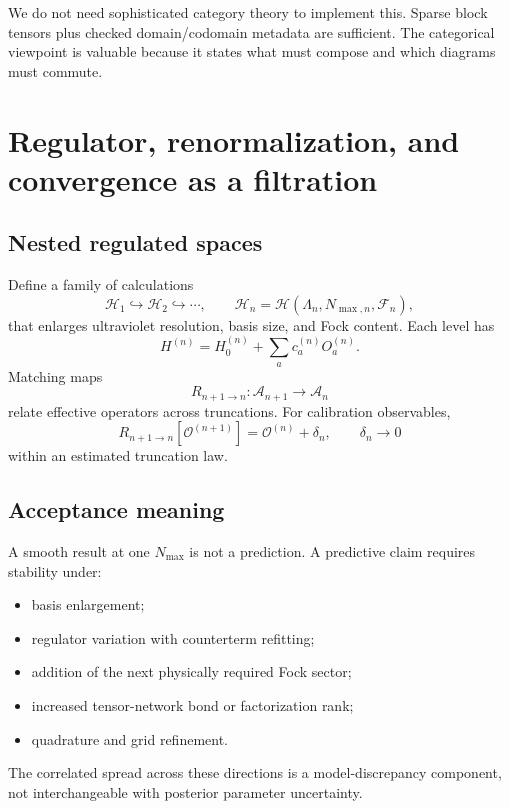 \documentclass[11pt]{article}
\newcommand{\Hil}{\mathcal H}
\newcommand{\Alg}{\mathcal A}
\begin{document}
We do not need sophisticated category theory to implement this.  Sparse
block tensors plus checked domain/codomain metadata are sufficient.  The
categorical viewpoint is valuable because it states what must compose and
which diagrams must commute.

\section{Regulator, renormalization, and convergence as a filtration}

\subsection{Nested regulated spaces}

Define a family of calculations
\begin{equation}
\Hil_1\hookrightarrow\Hil_2\hookrightarrow\cdots,
\qquad
\Hil_n=\Hil(\Lambda_n,N_{\max,n},\mathcal F_n),
\label{eq:filtration}
\end{equation}
that enlarges ultraviolet resolution, basis size, and Fock content.  Each
level has
\begin{equation}
H^{(n)}=H_0^{(n)}+\sum_a c_a^{(n)}O_a^{(n)}.
\end{equation}
Matching maps
\begin{equation}
R_{n+1\to n}:\Alg_{n+1}\longrightarrow\Alg_n
\label{eq:matching-map}
\end{equation}
relate effective operators across truncations.  For calibration observables,
\begin{equation}
R_{n+1\to n}[\mathcal O^{(n+1)}]
=\mathcal O^{(n)}+\delta_n,
\qquad
\delta_n\to0
\label{eq:projective-consistency}
\end{equation}
within an estimated truncation law.

\subsection{Acceptance meaning}

A smooth result at one \(N_{\max}\) is not a prediction.  A predictive
claim requires stability under:
\begin{itemize}
\item basis enlargement;
\item regulator variation with counterterm refitting;
\item addition of the next physically required Fock sector;
\item increased tensor-network bond or factorization rank;
\item quadrature and grid refinement.
\end{itemize}
The correlated spread across these directions is a model-discrepancy
component, not interchangeable with posterior parameter uncertainty.
\end{document}

